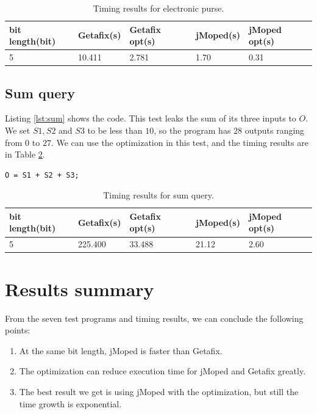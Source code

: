 \begin{table}[!h]
\centering
\begin{tabular}{|l|l|l|l|l|}
\hline
{bit length(bit)} & Getafix(s) & {Getafix opt(s)} & jMoped(s) & {jMoped opt(s)} \\ \hline
{5} & {10.411} & {2.781} & {1.70} & {0.31} \\ \hline
\end{tabular}
\caption{Timing results for electronic purse.}
\label{tbl:electronic}
\end{table}

\subsection{Sum query}
Listing \ref{lst:sum} shows the code. This test leaks the sum of its three inputs to $O$. We set $S1, S2$ and $S3$ to be less than $10$, so the program has $28$ outputs ranging from $0$ to $27$. We can use the optimization in this test, and the timing results are in Table \ref{tbl:sum}.

\lstset{language=C}  
\begin{lstlisting}[float=!h, caption={Sum query test program.},label=lst:sum]
O = S1 + S2 + S3;
\end{lstlisting}

\begin{table}[!h]
\centering
\begin{tabular}{|l|l|l|l|l|}
\hline
{bit length(bit)} & Getafix(s) & {Getafix opt(s)} & jMoped(s) & {jMoped opt(s)} \\ \hline
5 & 225.400 & 33.488 & 21.12 & 2.60	\\ \hline
\end{tabular}
\caption{Timing results for sum query.}
\label{tbl:sum}
\end{table}

\section{Results summary}
From the seven test programs and timing results, we can conclude the following points:
\begin{enumerate}
\item At the same bit length, jMoped is faster than Getafix. 
\item The optimization can reduce execution time for jMoped and Getafix greatly.
\item The best result we get is using jMoped with the optimization, but still the time growth is exponential.
\end{enumerate}

